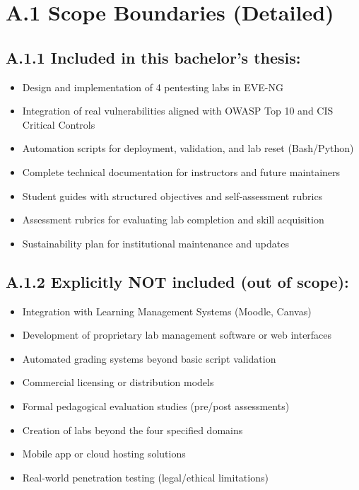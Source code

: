 



\section*{A.1 Scope Boundaries (Detailed)}


\subsection*{A.1.1 Included in this bachelor's thesis:}


\begin{itemize}
    \item Design and implementation of 4 pentesting labs in EVE-NG
    \item Integration of real vulnerabilities aligned with OWASP Top 10 and CIS Critical Controls
    \item Automation scripts for deployment, validation, and lab reset (Bash/Python)
    \item Complete technical documentation for instructors and future maintainers
    \item Student guides with structured objectives and self-assessment rubrics
    \item Assessment rubrics for evaluating lab completion and skill acquisition
    \item Sustainability plan for institutional maintenance and updates
\end{itemize}


\subsection*{A.1.2 Explicitly NOT included (out of scope):}


\begin{itemize}
    \item Integration with Learning Management Systems (Moodle, Canvas)
    \item Development of proprietary lab management software or web interfaces
    \item Automated grading systems beyond basic script validation
    \item Commercial licensing or distribution models
    \item Formal pedagogical evaluation studies (pre/post assessments)
    \item Creation of labs beyond the four specified domains
    \item Mobile app or cloud hosting solutions
    \item Real-world penetration testing (legal/ethical limitations)
\end{itemize}


